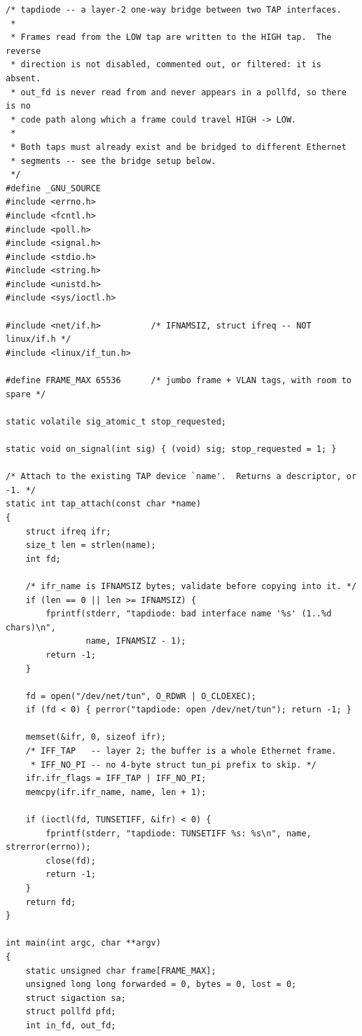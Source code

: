 \documentclass[11pt,a4paper]{article}
\begin{document}
\begin{lstlisting}[style=c,label={lst:tapdiode},caption={%
  \file{tapdiode.c} --- a one-way layer-2 forwarder. Build with
  \cmd{cc -O2 -Wall -Wextra -pedantic -std=c11 -o tapdiode tapdiode.c}}]
/* tapdiode -- a layer-2 one-way bridge between two TAP interfaces.
 *
 * Frames read from the LOW tap are written to the HIGH tap.  The reverse
 * direction is not disabled, commented out, or filtered: it is absent.
 * out_fd is never read from and never appears in a pollfd, so there is no
 * code path along which a frame could travel HIGH -> LOW.
 *
 * Both taps must already exist and be bridged to different Ethernet
 * segments -- see the bridge setup below.
 */
#define _GNU_SOURCE
#include <errno.h>
#include <fcntl.h>
#include <poll.h>
#include <signal.h>
#include <stdio.h>
#include <string.h>
#include <unistd.h>
#include <sys/ioctl.h>

#include <net/if.h>          /* IFNAMSIZ, struct ifreq -- NOT linux/if.h */
#include <linux/if_tun.h>

#define FRAME_MAX 65536      /* jumbo frame + VLAN tags, with room to spare */

static volatile sig_atomic_t stop_requested;

static void on_signal(int sig) { (void) sig; stop_requested = 1; }

/* Attach to the existing TAP device `name'.  Returns a descriptor, or -1. */
static int tap_attach(const char *name)
{
    struct ifreq ifr;
    size_t len = strlen(name);
    int fd;

    /* ifr_name is IFNAMSIZ bytes; validate before copying into it. */
    if (len == 0 || len >= IFNAMSIZ) {
        fprintf(stderr, "tapdiode: bad interface name '%s' (1..%d chars)\n",
                name, IFNAMSIZ - 1);
        return -1;
    }

    fd = open("/dev/net/tun", O_RDWR | O_CLOEXEC);
    if (fd < 0) { perror("tapdiode: open /dev/net/tun"); return -1; }

    memset(&ifr, 0, sizeof ifr);
    /* IFF_TAP   -- layer 2; the buffer is a whole Ethernet frame.
     * IFF_NO_PI -- no 4-byte struct tun_pi prefix to skip. */
    ifr.ifr_flags = IFF_TAP | IFF_NO_PI;
    memcpy(ifr.ifr_name, name, len + 1);

    if (ioctl(fd, TUNSETIFF, &ifr) < 0) {
        fprintf(stderr, "tapdiode: TUNSETIFF %s: %s\n", name, strerror(errno));
        close(fd);
        return -1;
    }
    return fd;
}

int main(int argc, char **argv)
{
    static unsigned char frame[FRAME_MAX];
    unsigned long long forwarded = 0, bytes = 0, lost = 0;
    struct sigaction sa;
    struct pollfd pfd;
    int in_fd, out_fd;


\end{lstlisting}
\end{document}
